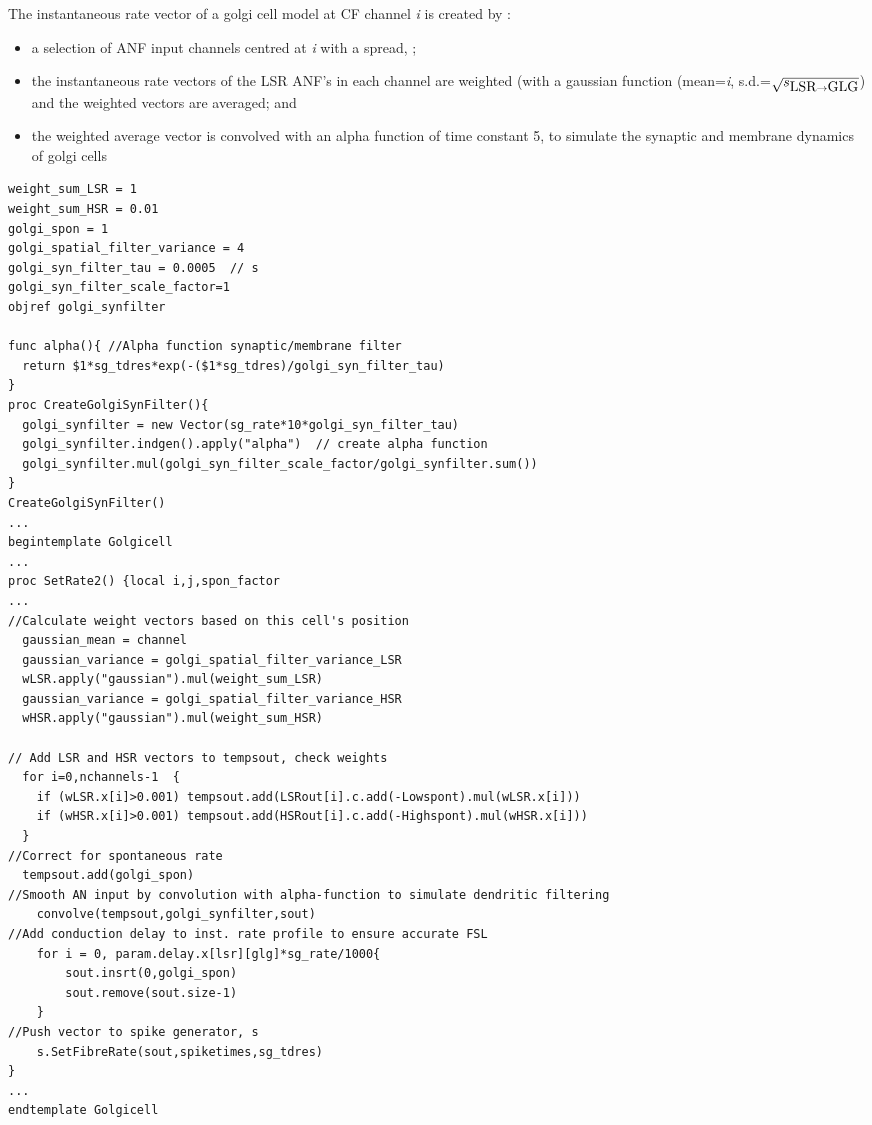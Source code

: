 \begin{appendix}
The instantaneous rate vector of a golgi cell model at CF channel
\emph{i} is created by :
\begin{itemize}
 \item a selection of ANF input channels centred at \emph{i} with a
 spread, \sLSRGLG;
 \item the instantaneous rate vectors of the LSR ANF's in each channel
 are weighted (with a gaussian function (mean=\emph{i},
 s.d.=$\sqrt{\protect s_{\protect\mbox{LSR} \to \mbox{GLG}}}$) and the weighted vectors are averaged; and
 \item the weighted average vector is convolved with an alpha function
 of time constant 5, to simulate the synaptic and membrane dynamics of
 golgi cells
\end{itemize}

 \medskip{}

\begin{lstlisting}[caption=Create golgi cell rate vector within Golgi template (in CNcell.tem)]
weight_sum_LSR = 1
weight_sum_HSR = 0.01
golgi_spon = 1
golgi_spatial_filter_variance = 4
golgi_syn_filter_tau = 0.0005  // s
golgi_syn_filter_scale_factor=1
objref golgi_synfilter

func alpha(){ //Alpha function synaptic/membrane filter
  return $1*sg_tdres*exp(-($1*sg_tdres)/golgi_syn_filter_tau)
}
proc CreateGolgiSynFilter(){ 
  golgi_synfilter = new Vector(sg_rate*10*golgi_syn_filter_tau)
  golgi_synfilter.indgen().apply("alpha")  // create alpha function
  golgi_synfilter.mul(golgi_syn_filter_scale_factor/golgi_synfilter.sum()) 
}
CreateGolgiSynFilter()
...
begintemplate Golgicell
...
proc SetRate2() {local i,j,spon_factor
...
//Calculate weight vectors based on this cell's position
  gaussian_mean = channel
  gaussian_variance = golgi_spatial_filter_variance_LSR
  wLSR.apply("gaussian").mul(weight_sum_LSR)
  gaussian_variance = golgi_spatial_filter_variance_HSR
  wHSR.apply("gaussian").mul(weight_sum_HSR)

// Add LSR and HSR vectors to tempsout, check weights 
  for i=0,nchannels-1  {
    if (wLSR.x[i]>0.001) tempsout.add(LSRout[i].c.add(-Lowspont).mul(wLSR.x[i]))
    if (wHSR.x[i]>0.001) tempsout.add(HSRout[i].c.add(-Highspont).mul(wHSR.x[i]))
  }
//Correct for spontaneous rate
  tempsout.add(golgi_spon)
//Smooth AN input by convolution with alpha-function to simulate dendritic filtering
    convolve(tempsout,golgi_synfilter,sout)
//Add conduction delay to inst. rate profile to ensure accurate FSL
    for i = 0, param.delay.x[lsr][glg]*sg_rate/1000{
        sout.insrt(0,golgi_spon)
        sout.remove(sout.size-1)
    }
//Push vector to spike generator, s
    s.SetFibreRate(sout,spiketimes,sg_tdres)
}
...
endtemplate Golgicell
\end{lstlisting}

\end{appendix}





